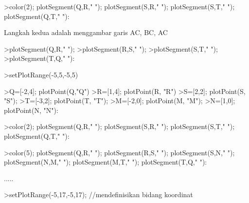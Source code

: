\documentclass[a4paper,10pt]{article}
\begin{document}
\begin{eulernotebook}
\begin{eulercomment}
\begin{eulercomment}
\begin{eulerprompt}
>color(2); plotSegment(Q,R," "); plotSegment(S,R," ");  plotSegment(S,T," "); plotSegment(Q,T," "):
\end{eulerprompt}
\begin{eulercomment}
Langkah kedua adalah menggambar garis AC, BC, AC
\end{eulercomment}
\begin{eulerprompt}
>plotSegment(Q,R," ");
>plotSegment(R,S," ");
>plotSegment(S,T," ");
>plotSegment(T,Q," "):
\end{eulerprompt}
\begin{eulercomment}
\end{eulercomment}
\begin{eulerprompt}
>setPlotRange(-5,5,-5,5)
\end{eulerprompt}
\begin{euleroutput}
  [-5,  5,  -5,  5]
\end{euleroutput}
\begin{eulerprompt}
>Q=[-2,4]; plotPoint(Q,"Q")
>R=[1,4]; plotPoint(R, "R")
>S=[2,2]; plotPoint(S, "S");
>T=[-3,2]; plotPoint(T, "T"); 
>M=[-2,0]; plotPoint(M, "M");
>N=[1,0]; plotPoint(N, "N"):
\end{eulerprompt}
\begin{eulerprompt}
>color(2); plotSegment(Q,R," "); plotSegment(S,R," "); plotSegment(S,T," "); plotSegment(Q,T," "):
\end{eulerprompt}
\begin{eulerprompt}
>color(5); plotSegment(Q,R," "); plotSegment(R,S," ");  plotSegment(S,N," "); plotSegment(N,M," "); plotSegment(M,T," "); plotSegment(T,Q," "):
\end{eulerprompt}
\begin{eulercomment}
.....
\end{eulercomment}
\begin{eulerprompt}
>setPlotRange(-5,17,-5,17); //mendefinisikan bidang koordinat

\end{eulerprompt}
\end{eulercomment}
\end{eulercomment}
\end{eulernotebook}
\end{document}
